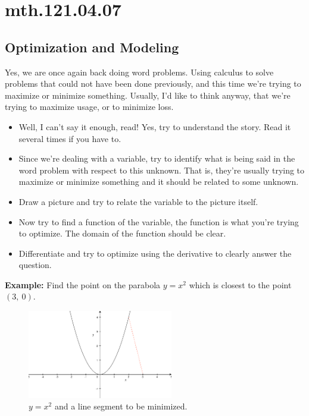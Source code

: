 \documentclass[12pt,addpoints, answers, fleqn]{exam}
\begin{document}
\section{mth.121.04.07}
\subsection{Optimization and Modeling}
Yes, we are once again back doing word problems. Using calculus to solve problems that could not have been done previously, and this time we're trying to maximize or minimize something. Usually, I'd like to think anyway, that we're trying to maximize usage, or to minimize loss.
\begin{itemize}
\item Well, I can't say it enough, read! Yes, try to understand the story. Read it several times if you have to.
\item Since we're dealing with a variable, try to identify what is being said in the word problem with respect to this unknown. That is, they're usually trying to maximize or minimize something and it should be related to some unknown.
\item Draw a picture and try to relate the variable to the picture itself.
\item Now try to find a function of the variable, the function is what you're trying to optimize.  The domain of the function should be clear.
\item Differentiate and try to optimize using the derivative to clearly answer the question.
\end{itemize}




\textbf{Example:}  Find the point on the parabola $y=x^2$ which is closest to the point $\left( 3, \ 0 \right)$.

\begin{figure}[htbp] %
   \centering
   \includegraphics[width=2.5in]{./graphics/graph2401.pdf} 
   \caption{$y=x^2$ and a line segment to be minimized.}
   \label{fig:2401}
\end{figure}
\end{document}
